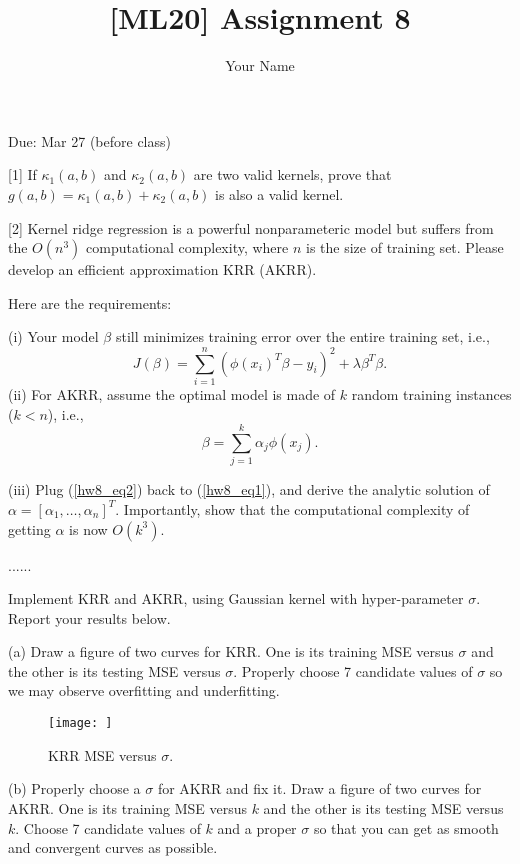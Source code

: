 \documentclass{llncs}
\title{[ML20] Assignment 8}
\author{Your Name}
\institute{}
\begin{document}
\maketitle 

\setlength\parindent{0pt} 
\setlength{\parskip}{10pt}

Due: Mar 27 (before class) 

[1] If $\kappa_{1}(a,b)$ and $\kappa_{2}(a,b)$ 
are two valid kernels, prove that 
$g(a,b) = \kappa_{1}(a,b) + \kappa_{2}(a,b)$ is 
also a valid kernel. 

[2] Kernel ridge regression is a powerful nonparameteric 
model but suffers from the $O(n^{3})$ computational complexity, 
where $n$ is the size of training set. Please develop 
an efficient approximation KRR (AKRR). 

Here are the requirements: 

(i) Your model $\beta$ still minimizes training 
error over the entire training set, i.e., 
\begin{equation}
\label{hw8_eq1}
J(\beta) = \sum_{i=1}^{n} (\phi(x_{i})^{T} \beta 
- y_{i})^{2} + \lambda \beta^{T} \beta. 
\end{equation}
(ii) For AKRR, assume the optimal model is made 
of $k$ random training instances ($k < n$), i.e., 
\begin{equation}
\label{hw8_eq2}
\beta = \sum_{j = 1}^{k} \alpha_{j} \phi(x_{j}).
\end{equation}

(iii) Plug (\ref{hw8_eq2}) back to (\ref{hw8_eq1}), 
and derive the analytic solution of $\alpha 
= [\alpha_{1}, \ldots, \alpha_{n}]^{T}$. Importantly, 
show that the computational complexity of getting 
$\alpha$ is now $O(k^{3})$. 

......


Implement KRR and AKRR, using Gaussian kernel with 
hyper-parameter $\sigma$. Report your results below. 

(a) Draw a figure of two curves for KRR. 
One is its training MSE versus $\sigma$ and the 
other is its testing MSE versus $\sigma$. 
Properly choose 7 candidate values of $\sigma$ 
so we may observe overfitting and underfitting. 

\begin{figure}[h!] 
\centering 
\texttt{[image: ]} 
\caption{KRR MSE versus $\sigma$.} 
\end{figure}

(b) Properly choose a $\sigma$ for AKRR and fix it. 
Draw a figure of two curves for AKRR. 
One is its training MSE versus $k$ and the other 
is its testing MSE versus $k$. Choose 7 candidate 
values of $k$ and a proper $\sigma$ so that you can 
get as smooth and convergent curves as possible. 
\end{document}
